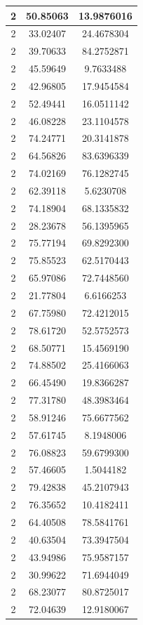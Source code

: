 \documentclass[
]{book}
\begin{document}
\begin{tabular}{c|c|c}
\hline
2 & 50.85063 & 13.9876016\\
\hline
2 & 33.02407 & 24.4678304\\
\hline
2 & 39.70633 & 84.2752871\\
\hline
2 & 45.59649 & 9.7633488\\
\hline
2 & 42.96805 & 17.9454584\\
\hline
2 & 52.49441 & 16.0511142\\
\hline
2 & 46.08228 & 23.1104578\\
\hline
2 & 74.24771 & 20.3141878\\
\hline
2 & 64.56826 & 83.6396339\\
\hline
2 & 74.02169 & 76.1282745\\
\hline
2 & 62.39118 & 5.6230708\\
\hline
2 & 74.18904 & 68.1335832\\
\hline
2 & 28.23678 & 56.1395965\\
\hline
2 & 75.77194 & 69.8292300\\
\hline
2 & 75.85523 & 62.5170443\\
\hline
2 & 65.97086 & 72.7448560\\
\hline
2 & 21.77804 & 6.6166253\\
\hline
2 & 67.75980 & 72.4212015\\
\hline
2 & 78.61720 & 52.5752573\\
\hline
2 & 68.50771 & 15.4569190\\
\hline
2 & 74.88502 & 25.4166063\\
\hline
2 & 66.45490 & 19.8366287\\
\hline
2 & 77.31780 & 48.3983464\\
\hline
2 & 58.91246 & 75.6677562\\
\hline
2 & 57.61745 & 8.1948006\\
\hline
2 & 76.08823 & 59.6799300\\
\hline
2 & 57.46605 & 1.5044182\\
\hline
2 & 79.42838 & 45.2107943\\
\hline
2 & 76.35652 & 10.4182411\\
\hline
2 & 64.40508 & 78.5841761\\
\hline
2 & 40.63504 & 73.3947504\\
\hline
2 & 43.94986 & 75.9587157\\
\hline
2 & 30.99622 & 71.6944049\\
\hline
2 & 68.23077 & 80.8725017\\
\hline
2 & 72.04639 & 12.9180067\\

\end{tabular}
\end{document}
